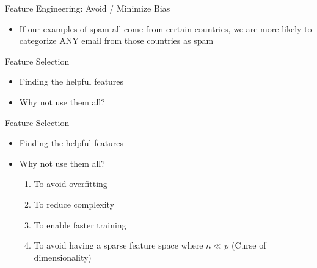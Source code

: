\documentclass[aspectratio=169]{beamer}
\begin{document}
\begin{frame}{Feature Engineering: Avoid / Minimize Bias}

\begin{itemize}
\item If our examples of spam all come from certain countries, we are more likely to categorize ANY email from those countries as spam

\end{itemize}
\end{frame}
\begin{frame}{Feature Selection}

\begin{itemize}
\item Finding the helpful features
\item[] Why not use them all?
\end{itemize}
\end{frame}
\begin{frame}{Feature Selection}

\begin{itemize}
\item Finding the helpful features
\item Why not use them all?
\begin{enumerate}
\item To avoid overfitting
\item To reduce complexity
\item To enable faster training
\item To avoid having a sparse feature space where $n \ll p$ (Curse of dimensionality)
\end{enumerate}
\end{itemize}
\end{frame}
\end{document}
